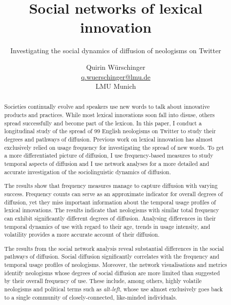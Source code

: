 \documentclass[
  a4paper,
  abstract=on,
  captions=tableabove,
  ]{scrartcl}
\newcommand{\ol}[1]{\emph{#1}}
\begin{document}

  \author{
    Quirin Würschinger\\
    \href{mailto:q.wuerschinger@lmu.de}{q.wuerschinger@lmu.de}\\
    LMU Munich
  }
  \date{}
  \title{Social networks of lexical innovation}
  \subtitle{Investigating the social dynamics of diffusion of neologisms on Twitter}
  \maketitle


  \begin{abstract}

    Societies continually evolve and speakers use new words to talk about innovative products and practices. While most lexical innovations soon fall into disuse, others spread successfully and become part of the lexicon. In this paper, I conduct a longitudinal study of the spread of 99 English neologisms on Twitter to study their degrees and pathways of diffusion. Previous work on lexical innovation has almost exclusively relied on usage frequency for investigating the spread of new words. To get a more differentiated picture of diffusion, I use frequency-based measures to study temporal aspects of diffusion and I use network analyses for a more detailed and accurate investigation of the sociolinguistic dynamics of diffusion.

    The results show that frequency measures manage to capture diffusion with varying success. Frequency counts can serve as an approximate indicator for overall degrees of diffusion, yet they miss important information about the temporal usage profiles of lexical innovations. The results indicate that neologisms with similar total frequency can exhibit significantly different degrees of diffusion. Analysing differences in their temporal dynamics of use with regard to their age, trends in usage intensity, and volatility provides a more accurate account of their diffusion.

    The results from the social network analysis reveal substantial differences in the social pathways of diffusion. Social diffusion significantly correlates with the frequency and temporal usage profiles of neologisms. Moreover, the network visualisations and metrics identify neologisms whose degrees of social diffusion are more limited than suggested by their overall frequency of use. These include, among others, highly volatile neologisms and political terms such as \ol{alt-left}, whose use almost exclusively goes back to a single community of closely-connected, like-minded individuals. 


\end{abstract}
\end{document}
